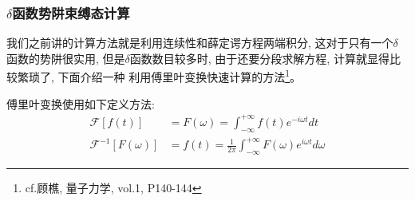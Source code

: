 \documentclass[a4paper,zihao=-4,linespread=1]{ctexrep}
\begin{document}
    \subsubsection*{$\delta$函数势阱束缚态计算}
    我们之前讲的计算方法就是利用连续性和薛定谔方程两端积分, 这对于只有一个$\delta$函数的势阱很实用, 但是$\delta$函数数目较多时, 由于还要分段求解方程, 计算就显得比较繁琐了, 下面介绍一种
    利用傅里叶变换快速计算的方法\footnote[2]{cf.顾樵, 量子力学, vol.1, P140-144}。

    傅里叶变换使用如下定义方法:
    \begin{equation}
        \label{傅里叶变换}
        \begin{aligned}
        \mathscr{F}[f(t)] &=F(\omega)=\int_{-\infty}^{+\infty} f(t) e^{-i \omega t} d t \\
        \mathscr{F}^{-1}[F(\omega)] &=f(t)=\frac{1}{2 \pi} \int_{-\infty}^{+\infty} F(\omega) e^{i \omega t} d \omega
        \end{aligned}
    \end{equation}
\end{document}
